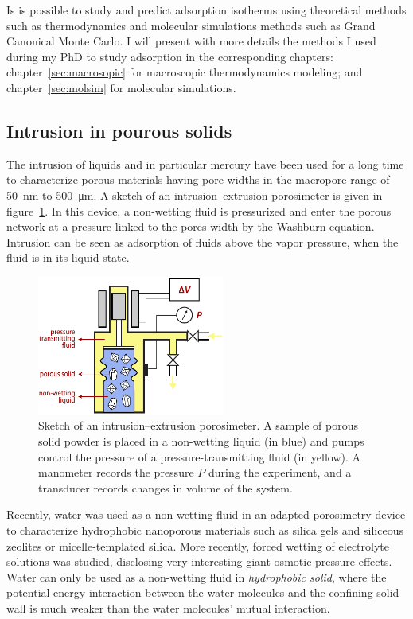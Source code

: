 \documentclass[thesis]{subfiles}
\begin{document}
Is is possible to study and predict adsorption isotherms using theoretical
methods such as thermodynamics and molecular simulations methods such as Grand
Canonical Monte Carlo. I will present with more details the methods I used
during my PhD to study adsorption in the corresponding chapters:
chapter~\ref{sec:macrosopic} for macroscopic thermodynamics modeling; and
chapter~\ref{sec:molsim} for molecular simulations.

\subsection{Intrusion in pourous solids}

The intrusion of liquids and in particular mercury have been used for a long
time to characterize porous materials having pore widths in the macropore range
of \SI{50}{nm} to \SI{500}{\um}\cite{Rouquerol2011}. A sketch of an
intrusion--extrusion porosimeter is given in figure~\ref{fig:porosimeter}. In
this device, a non-wetting fluid is pressurized and enter the porous network at
a pressure linked to the pores width by the Washburn equation. Intrusion can be
seen as adsorption of fluids above the vapor pressure, \ie when the fluid is in
its liquid state.

\begin{figure}[htb]
    \centering
    \includegraphics[width=0.55\textwidth]{figures/images/porosimeter}
    \caption{Sketch of an intrusion--extrusion porosimeter. A sample of porous
    solid powder is placed in a non-wetting liquid (in blue) and pumps control
    the pressure of a pressure-transmitting fluid (in yellow). A manometer
    records the pressure $P$ during the experiment, and a transducer records
    changes in volume of the system.}
  \label{fig:porosimeter}
\end{figure}

Recently, water was used as a non-wetting fluid in an adapted porosimetry
device to characterize hydrophobic nanoporous materials such as silica
gels\cite{Fadeev1997} and siliceous zeolites\cite{Eroshenko2001, Eroshenko2002}
or micelle-templated silica\cite{Lefevre2004}. More recently, forced wetting of
electrolyte solutions was studied, disclosing very interesting giant osmotic
pressure effects\cite{Liu2009, MichelinJamois2015}. Water can only be used as a
non-wetting fluid in \emph{hydrophobic solid}, where the potential energy
interaction between the water molecules and the confining solid wall is much
weaker than the water molecules' mutual interaction.
\end{document}

